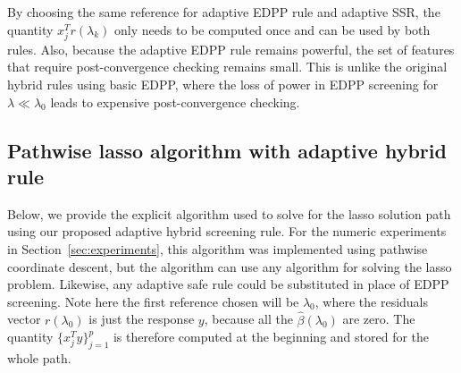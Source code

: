 By choosing the same reference for adaptive EDPP rule and adaptive SSR, the quantity $x_j^Tr(\lambda_k)$ only needs to be computed once and can be used by both rules. Also, because the adaptive EDPP rule remains powerful, the set of features that require post-convergence checking remains small.  This is unlike the original hybrid rules using basic EDPP, where the loss of power in EDPP screening for $\lambda \ll \lambda_0$ leads to expensive post-convergence checking.

\subsection{Pathwise lasso algorithm with adaptive hybrid rule}

Below, we provide the explicit algorithm used to solve for the lasso solution path using our proposed adaptive hybrid screening rule. For the numeric experiments in Section~\ref{sec:experiments}, this algorithm was implemented using pathwise coordinate descent, but the algorithm can use any algorithm for solving the lasso problem.  Likewise, any adaptive safe rule could be substituted in place of EDPP screening.  Note here the first reference chosen will be $\lambda_0$, where the residuals vector $r(\lambda_0)$ is just the response $y$, because all the $\hat{\beta}(\lambda_0)$ are zero. The quantity $\{x_j^Ty\}_{j=1}^p$ is therefore computed at the beginning and stored for the whole path.

